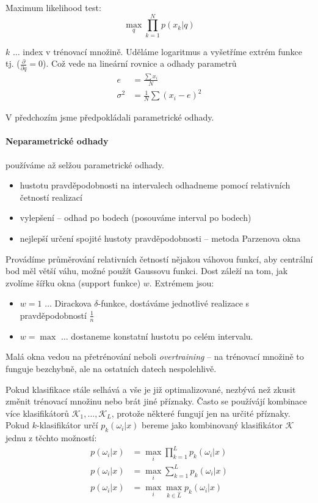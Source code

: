 Maximum likelihood test:
\begin{equation}
\max\limits_q\prod\limits_{k=1}^N p(x_k|q)
\end{equation}

$k$ $\dots$ index v trénovací množině. Uděláme logaritmus a vyšetříme extrém funkce tj. ($\frac{\partial}{\partial q}=0$).
Což vede na lineární rovnice a odhady parametrů
\begin{align}
e &= \frac{\sum x_i}{N}\\
\sigma^2 &= \frac{1}{N}\sum(x_i-e)^2
\end{align}

V předchozím jsme předpokládali parametrické odhady.

\paragraph{Neparametrické odhady} používáme až selžou parametrické odhady.

\begin{itemize}
	\item hustotu pravděpodobnosti na intervalech odhadneme pomocí relativních četností realizací
	\item vylepšení -- odhad po bodech (posouváme interval po bodech)
	\item nejlepší určení spojité hustoty pravděpodobnosti -- metoda Parzenova okna
\end{itemize}

Provádíme průměrování relativních četností nějakou váhovou funkcí, aby centrální bod měl větší váhu, 
možné použít Gaussovu funkci. Dost záleží na tom, jak zvolíme šířku okna (support funkce) $w$. Extrémem 
jsou:
\begin{itemize}
	\item $w=1$ $\dots$ Dirackova $\delta$-funkce, dostáváme jednotlivé realizace s pravděpodobností $\frac{1}{n}$
	\item $w=\max$ $\dots$ dostaneme konstatní hustotu po celém intervalu. 
\end{itemize}

Malá okna vedou na přetrénování neboli \emph{overtraining} -- na trénovací množině to funguje bezchybně, ale na ostatních
datech nespolehlivě.


Pokud klasifikace stále selhává a vše je již optimalizované, nezbývá než zkusit změnit trénovací množinu nebo
brát jiné příznaky. Často se používájí kombinace více klasifikátorů $\mathcal{K}_1,\dots,\mathcal{K}_L$, protože 
některé fungují jen na určité příznaky. Pokud $k$-klasifikátor určí $p_k(\omega_i|x)$ bereme jako kombinovaný
klasifikátor $\mathcal{K}$ jednu z těchto možností:
\begin{align}
p(\omega_i|x) &= \max\limits_i\prod\limits_{k=1}^L p_k(\omega_i|x)\\
p(\omega_i|x) &= \max\limits_i \sum\limits_{k=1}^L p_k(\omega_i|x)\\
p(\omega_i|x) &= \max\limits_i \max\limits_{k\in\hat{L}} p_k(\omega_i|x)
\end{align}

